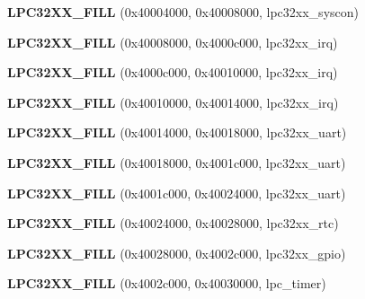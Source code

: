 \begin{DoxyCompactItemize}
{\bfseries L\+P\+C32\+X\+X\+\_\+\+F\+I\+LL} (0x40004000, 0x40008000, lpc32xx\+\_\+syscon)
\item 
\mbox{\label{structlpc32xx__registers_a83ef24b8d0ce53038ee1781a1025571e}} 
{\bfseries L\+P\+C32\+X\+X\+\_\+\+F\+I\+LL} (0x40008000, 0x4000c000, lpc32xx\+\_\+irq)
\item 
\mbox{\label{structlpc32xx__registers_abafb94c8a7990e87f71bb79cd06e84e9}} 
{\bfseries L\+P\+C32\+X\+X\+\_\+\+F\+I\+LL} (0x4000c000, 0x40010000, lpc32xx\+\_\+irq)
\item 
\mbox{\label{structlpc32xx__registers_a6c036b4a84cf6fe91d8f7e4abee09c98}} 
{\bfseries L\+P\+C32\+X\+X\+\_\+\+F\+I\+LL} (0x40010000, 0x40014000, lpc32xx\+\_\+irq)
\item 
\mbox{\label{structlpc32xx__registers_a2e509ba6ad525dd8af49a1592f6299a6}} 
{\bfseries L\+P\+C32\+X\+X\+\_\+\+F\+I\+LL} (0x40014000, 0x40018000, lpc32xx\+\_\+uart)
\item 
\mbox{\label{structlpc32xx__registers_aaf50c188e1efca9025938692fc7e3ad8}} 
{\bfseries L\+P\+C32\+X\+X\+\_\+\+F\+I\+LL} (0x40018000, 0x4001c000, lpc32xx\+\_\+uart)
\item 
\mbox{\label{structlpc32xx__registers_a1e57424feb8e919f50a9bce172916250}} 
{\bfseries L\+P\+C32\+X\+X\+\_\+\+F\+I\+LL} (0x4001c000, 0x40024000, lpc32xx\+\_\+uart)
\item 
\mbox{\label{structlpc32xx__registers_acf64fad59d22e1a0e136c629a7acab22}} 
{\bfseries L\+P\+C32\+X\+X\+\_\+\+F\+I\+LL} (0x40024000, 0x40028000, lpc32xx\+\_\+rtc)
\item 
\mbox{\label{structlpc32xx__registers_a0529d4884ff4738e44aa13baff6247aa}} 
{\bfseries L\+P\+C32\+X\+X\+\_\+\+F\+I\+LL} (0x40028000, 0x4002c000, lpc32xx\+\_\+gpio)
\item 
\mbox{\label{structlpc32xx__registers_aceb6f68959bad622bce4aa631ac61d41}} 
{\bfseries L\+P\+C32\+X\+X\+\_\+\+F\+I\+LL} (0x4002c000, 0x40030000, lpc\+\_\+timer)

\end{DoxyCompactItemize}
